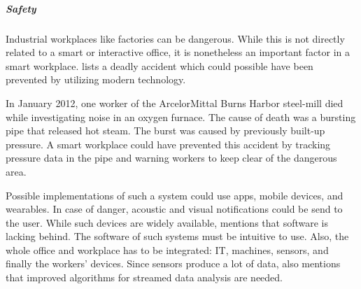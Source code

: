 \subparagraph{Safety}\label{sec:sda-safety}
Industrial workplaces like factories can be dangerous. While this is not directly related to a smart 
or interactive office, it is nonetheless an important factor in a smart workplace. \cite{sda-wired} 
lists a deadly accident which could possible have been prevented by utilizing modern technology.

In January 2012, one worker of the ArcelorMittal Burns Harbor steel-mill died while investigating 
noise in an oxygen furnace. The cause of death was a bursting pipe that released hot steam. The 
burst was caused by previously built-up pressure. A smart workplace could have prevented this 
accident by tracking pressure data in the pipe and warning workers to keep clear of the dangerous 
area.

Possible implementations of such a system could use apps, mobile devices, and wearables. In case of 
danger, acoustic and visual notifications could be send to the user. While such devices are widely 
available, \cite{sda-wired} mentions that software is lacking behind. The software of such systems 
must be intuitive to use. Also, the whole office and workplace has to be integrated: IT, machines, 
sensors, and finally the workers' devices. Since sensors produce a lot of data, \cite{sda-wired} 
also mentions that improved algorithms for streamed data analysis are needed.




